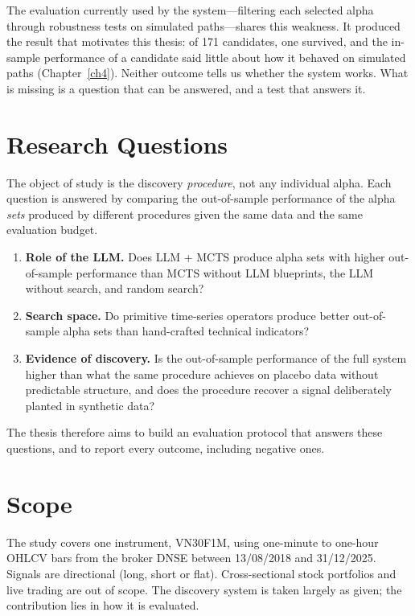 \documentclass[12pt,a4paper,oneside]{book}
\theoremstyle{definition}
\begin{document}
The evaluation currently used by the system---filtering each selected alpha through robustness tests on simulated paths---shares this weakness. It produced the result that motivates this thesis: of 171 candidates, one survived, and the in-sample performance of a candidate said little about how it behaved on simulated paths (Chapter~\ref{ch4}). Neither outcome tells us whether the system works. What is missing is a question that can be answered, and a test that answers it.

\section{Research Questions}

The object of study is the discovery \emph{procedure}, not any individual alpha. Each question is answered by comparing the out-of-sample performance of the alpha \emph{sets} produced by different procedures given the same data and the same evaluation budget.

\begin{enumerate}
  \item[\textbf{RQ1.}] \textbf{Role of the LLM.} Does LLM + MCTS produce alpha sets with higher out-of-sample performance than MCTS without LLM blueprints, the LLM without search, and random search?
  \item[\textbf{RQ2.}] \textbf{Search space.} Do primitive time-series operators produce better out-of-sample alpha sets than hand-crafted technical indicators?
  \item[\textbf{RQ3.}] \textbf{Evidence of discovery.} Is the out-of-sample performance of the full system higher than what the same procedure achieves on placebo data without predictable structure, and does the procedure recover a signal deliberately planted in synthetic data?
\end{enumerate}

The thesis therefore aims to build an evaluation protocol that answers these questions, and to report every outcome, including negative ones.

\section{Scope}

The study covers one instrument, VN30F1M, using one-minute to one-hour OHLCV bars from the broker DNSE between 13/08/2018 and 31/12/2025. Signals are directional (long, short or flat). Cross-sectional stock portfolios and live trading are out of scope. The discovery system is taken largely as given; the contribution lies in how it is evaluated.
\end{document}

